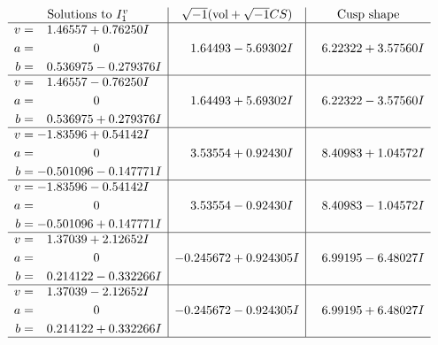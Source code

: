 \documentclass[1p]{elsarticle_modified}
\theoremstyle{definition}
\newcommand{\I}{\sqrt{-1}}
\begin{document}
$$\begin{array}{c|c|c}  
\text{Solutions to }I^v_{1}& \I (\text{vol} + \sqrt{-1}CS) & \text{Cusp shape}\\
 \hline 
\begin{aligned}
v &= \phantom{-}1.46557 + 0.76250 I \\
a &= \phantom{-0.000000 } 0 \\
b &= \phantom{-}0.536975 - 0.279376 I\end{aligned}
 & \phantom{-}1.64493 - 5.69302 I & \phantom{-}6.22322 + 3.57560 I \\ \hline\begin{aligned}
v &= \phantom{-}1.46557 - 0.76250 I \\
a &= \phantom{-0.000000 } 0 \\
b &= \phantom{-}0.536975 + 0.279376 I\end{aligned}
 & \phantom{-}1.64493 + 5.69302 I & \phantom{-}6.22322 - 3.57560 I \\ \hline\begin{aligned}
v &= -1.83596 + 0.54142 I \\
a &= \phantom{-0.000000 } 0 \\
b &= -0.501096 - 0.147771 I\end{aligned}
 & \phantom{-}3.53554 + 0.92430 I & \phantom{-}8.40983 + 1.04572 I \\ \hline\begin{aligned}
v &= -1.83596 - 0.54142 I \\
a &= \phantom{-0.000000 } 0 \\
b &= -0.501096 + 0.147771 I\end{aligned}
 & \phantom{-}3.53554 - 0.92430 I & \phantom{-}8.40983 - 1.04572 I \\ \hline\begin{aligned}
v &= \phantom{-}1.37039 + 2.12652 I \\
a &= \phantom{-0.000000 } 0 \\
b &= \phantom{-}0.214122 - 0.332266 I\end{aligned}
 & -0.245672 + 0.924305 I & \phantom{-}6.99195 - 6.48027 I \\ \hline\begin{aligned}
v &= \phantom{-}1.37039 - 2.12652 I \\
a &= \phantom{-0.000000 } 0 \\
b &= \phantom{-}0.214122 + 0.332266 I\end{aligned}
 & -0.245672 - 0.924305 I & \phantom{-}6.99195 + 6.48027 I\\
 \hline 
 \end{array}$$\newpage
\end{document}
